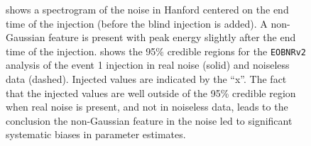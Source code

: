 \documentclass[12pt]{iopart}
\newcommand{\eob}{\texttt{EOBNRv2}\xspace}
\begin{document}
\begin{figure}[t]
  \caption{\label{fig:event1bias} 
       shows a spectrogram of the noise in Hanford
      centered on the end time of the injection (before the blind injection 
      is added).  A non-Gaussian feature is present with peak energy slightly 
      after the end time of
      the injection.  shows the 95\% credible
      regions for the \eob analysis of the event 1 injection in real noise
      (solid) and noiseless data (dashed).  Injected values are indicated by
      the ``x''.  The fact that the injected values are well outside of the
      95\% credible region when real noise is present, and not in noiseless
      data, leads to the conclusion the non-Gaussian feature in the noise led
      to significant systematic biases in parameter estimates.}
\end{figure}
\end{document}
